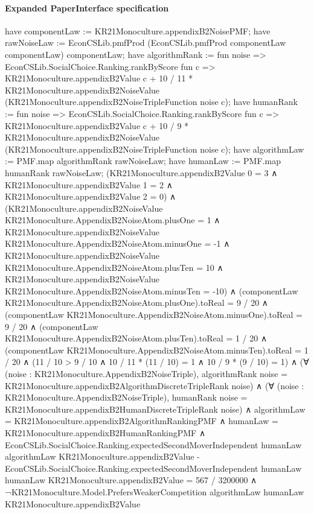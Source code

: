 \documentclass[10pt]{article}
\begin{document}
\paragraph{Expanded PaperInterface specification}
\begin{ReviewVerbatim}
have componentLaw := KR21Monoculture.appendixB2NoisePMF;
have rawNoiseLaw := EconCSLib.pmfProd (EconCSLib.pmfProd componentLaw componentLaw) componentLaw;
have algorithmRank := fun noise =>
  EconCSLib.SocialChoice.Ranking.rankByScore fun c =>
    KR21Monoculture.appendixB2Value c +
      10 / 11 * KR21Monoculture.appendixB2NoiseValue (KR21Monoculture.appendixB2NoiseTripleFunction noise c);
have humanRank := fun noise =>
  EconCSLib.SocialChoice.Ranking.rankByScore fun c =>
    KR21Monoculture.appendixB2Value c +
      10 / 9 * KR21Monoculture.appendixB2NoiseValue (KR21Monoculture.appendixB2NoiseTripleFunction noise c);
have algorithmLaw := PMF.map algorithmRank rawNoiseLaw;
have humanLaw := PMF.map humanRank rawNoiseLaw;
(KR21Monoculture.appendixB2Value 0 = 3 ∧
    KR21Monoculture.appendixB2Value 1 = 2 ∧ KR21Monoculture.appendixB2Value 2 = 0) ∧
  (KR21Monoculture.appendixB2NoiseValue KR21Monoculture.AppendixB2NoiseAtom.plusOne = 1 ∧
      KR21Monoculture.appendixB2NoiseValue KR21Monoculture.AppendixB2NoiseAtom.minusOne = -1 ∧
        KR21Monoculture.appendixB2NoiseValue KR21Monoculture.AppendixB2NoiseAtom.plusTen = 10 ∧
          KR21Monoculture.appendixB2NoiseValue KR21Monoculture.AppendixB2NoiseAtom.minusTen = -10) ∧
    (componentLaw KR21Monoculture.AppendixB2NoiseAtom.plusOne).toReal = 9 / 20 ∧
      (componentLaw KR21Monoculture.AppendixB2NoiseAtom.minusOne).toReal = 9 / 20 ∧
        (componentLaw KR21Monoculture.AppendixB2NoiseAtom.plusTen).toReal = 1 / 20 ∧
          (componentLaw KR21Monoculture.AppendixB2NoiseAtom.minusTen).toReal = 1 / 20 ∧
            (11 / 10 > 9 / 10 ∧ 10 / 11 * (11 / 10) = 1 ∧ 10 / 9 * (9 / 10) = 1) ∧
              (∀ (noise : KR21Monoculture.AppendixB2NoiseTriple),
                  algorithmRank noise = KR21Monoculture.appendixB2AlgorithmDiscreteTripleRank noise) ∧
                (∀ (noise : KR21Monoculture.AppendixB2NoiseTriple),
                    humanRank noise = KR21Monoculture.appendixB2HumanDiscreteTripleRank noise) ∧
                  algorithmLaw = KR21Monoculture.appendixB2AlgorithmRankingPMF ∧
                    humanLaw = KR21Monoculture.appendixB2HumanRankingPMF ∧
                      EconCSLib.SocialChoice.Ranking.expectedSecondMoverIndependent humanLaw algorithmLaw
                              KR21Monoculture.appendixB2Value -
                            EconCSLib.SocialChoice.Ranking.expectedSecondMoverIndependent humanLaw humanLaw
                              KR21Monoculture.appendixB2Value =
                          567 / 3200000 ∧
                        ¬KR21Monoculture.Model.PrefersWeakerCompetition algorithmLaw humanLaw
                            KR21Monoculture.appendixB2Value
\end{ReviewVerbatim}
\end{document}
